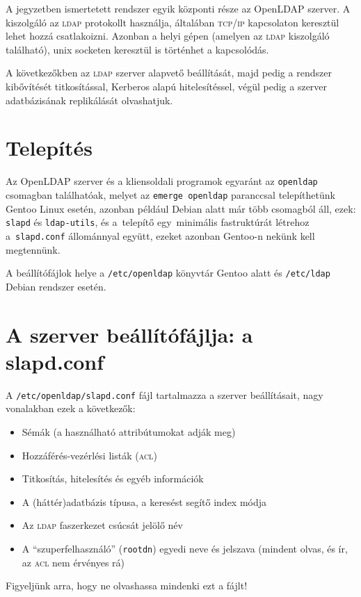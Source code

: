 A jegyzetben ismertetett rendszer egyik központi része az OpenLDAP szerver. A kiszolgáló az \textsc{ldap} protokollt
használja, általában \textsc{tcp}/\textsc{ip} kapcsolaton keresztül lehet hozzá csatlakoizni. Azonban a helyi gépen
(amelyen az \textsc{ldap} kiszolgáló található), unix socketen keresztül is történhet a kapcsolódás.

A következőkben az \textsc{ldap} szerver alapvető beállítását, majd pedig a rendszer kibővítését titkosítással,
Kerberos alapú hitelesítéssel, végül pedig a szerver adatbázisának replikálását olvashatjuk.


\section{Telepítés}
Az OpenLDAP szerver és a kliensoldali programok egyaránt az \texttt{openldap} csomagban találhatóak, melyet az
\texttt{emerge openldap} paranccsal telepíthetünk Gentoo Linux esetén, azonban például Debian alatt már több csomagból
áll, ezek: \texttt{slapd} és \texttt{ldap-utils}, és a~telepítő egy~minimális fastruktúrát létrehoz a~\texttt{slapd.conf}
állománnyal együtt, ezeket azonban Gentoo-n nekünk kell megtennünk.

A beállítófájlok helye a \texttt{/etc/openldap} könyvtár Gentoo alatt és \texttt{/etc/ldap} Debian rendszer esetén.

\section{A szerver beállítófájlja: a slapd.conf}
A \texttt{/etc/openldap/slapd.conf} fájl tartalmazza a szerver beállításait, nagy vonalakban ezek a következők:

\begin{itemize}
\item Sémák (a használható attribútumokat adják meg)
\item Hozzáférés-vezérlési listák (\textsc{acl})
\item Titkosítás, hitelesítés és egyéb információk
\item A (háttér)adatbázis típusa, a keresést segítő index módja
\item Az \textsc{ldap} faszerkezet csúcsát jelölő név
\item A ``szuperfelhasználó'' (\texttt{rootdn}) egyedi neve és jelszava (mindent olvas, és ír, az \textsc{acl} nem érvényes rá)
\end{itemize}  

Figyeljünk arra, hogy ne olvashassa mindenki ezt a fájlt!

